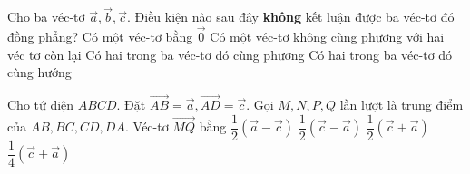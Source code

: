 \begin{ex}%
	Cho ba véc-tơ $\overrightarrow{a}, \overrightarrow{b}, \overrightarrow{c}$. Điều kiện nào sau đây \textbf{không} kết luận được ba véc-tơ đó đồng phẳng?
	\choice
	{Có một véc-tơ bằng $\overrightarrow{0}$}
	{\True Có một véc-tơ không cùng phương với hai véc tơ còn lại}
	{Có hai trong ba véc-tơ đó cùng phương}
	{Có hai trong ba véc-tơ đó cùng hướng}
\end{ex}
\begin{ex}%
	Cho tứ diện $ABCD$. Đặt $\overrightarrow{AB}= \overrightarrow{a}, \overrightarrow{AD}=\overrightarrow{c}$. Gọi $M,N,P,Q$ lần lượt là trung điểm của $AB,BC,CD,DA$. Véc-tơ $\overrightarrow{MQ}$ bằng
	\choice
	{$\dfrac{1}{2}\left(\overrightarrow{a}-\overrightarrow{c}\right)$}
	{\True $\dfrac{1}{2}\left(\overrightarrow{c}-\overrightarrow{a}\right)$}
	{$\dfrac{1}{2}\left(\overrightarrow{c}+\overrightarrow{a}\right)$}
	{$\dfrac{1}{4}\left(\overrightarrow{c}+\overrightarrow{a}\right)$}
\end{ex}
